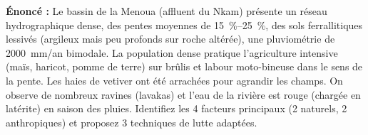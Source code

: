 \documentclass[11pt]{article}
\begin{document}
\begin{exoresolu}
\textbf{Énoncé :} Le bassin de la Menoua (affluent du Nkam) présente un réseau hydrographique dense, des pentes moyennes de \SIrange{15}{25}{\%}, des sols ferrallitiques lessivés (argileux mais peu profonds sur roche altérée), une pluviométrie de \SI{2000}{mm/an} bimodale. La population dense pratique l'agriculture intensive (maïs, haricot, pomme de terre) sur brûlis et labour moto-bineuse dans le sens de la pente. Les haies de vetiver ont été arrachées pour agrandir les champs. On observe de nombreux ravines (lavakas) et l'eau de la rivière est rouge (chargée en latérite) en saison des pluies. Identifiez les 4 facteurs principaux (2 naturels, 2 anthropiques) et proposez 3 techniques de lutte adaptées.


\end{exoresolu}
\end{document}
